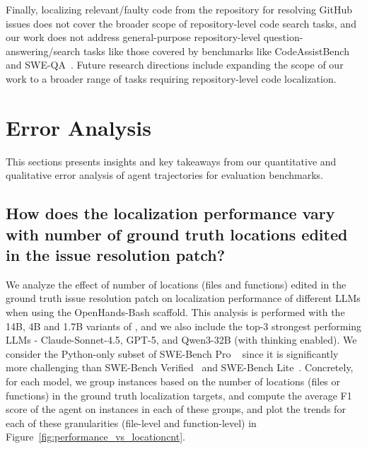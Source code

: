 Finally, localizing relevant/faulty code from the repository for resolving GitHub issues does not cover the broader scope of repository-level code search tasks, and our work does not address general-purpose repository-level question-answering/search tasks like those covered by benchmarks like CodeAssistBench~\citep{kim2026codeassistbenchcabdataset} and SWE-QA~\citep{peng2025sweqalanguagemodelsanswer}. Future research directions include expanding the scope of our work to a broader range of tasks requiring repository-level code localization.

\section{Error Analysis}\label{appendix:error_analysis}
This sections presents insights and key takeaways from our quantitative and qualitative error analysis of agent trajectories for evaluation benchmarks.

\subsection{How does the localization performance vary with number of ground truth locations edited in the issue resolution patch?}
We analyze the effect of number of locations (files and functions) edited in the ground truth issue resolution patch on localization performance of different LLMs when using the OpenHands-Bash scaffold. This analysis is performed with the 14B, 4B and 1.7B variants of \methodname, and we also include the top-3 strongest performing LLMs - Claude-Sonnet-4.5, GPT-5, and Qwen3-32B (with thinking enabled). We consider the Python-only subset of SWE-Bench Pro ~\citep{deng2025swebenchproaiagents} since it is significantly more challenging than SWE-Bench Verified~\citep{chowdhury2024swebenchverified} and SWE-Bench Lite~\citep{jimenez2024swebenchlanguagemodelsresolve}. Concretely, for each model, we group instances based on the number of locations (files or functions) in the ground truth localization targets, and compute the average F1 score of the agent on instances in each of these groups, and plot the trends for each of these granularities (file-level and function-level) in Figure~\ref{fig:performance_vs_locationcnt}.

